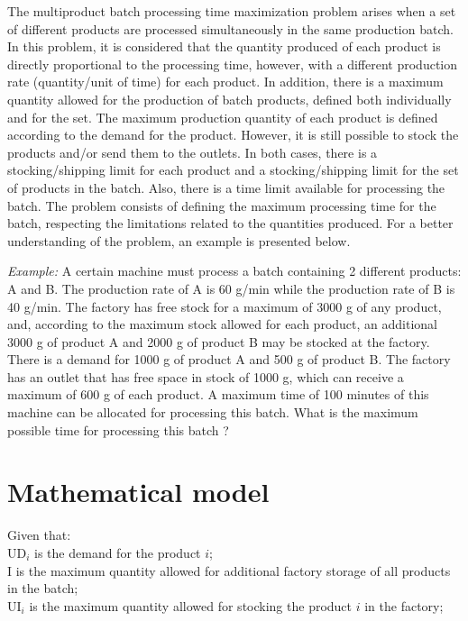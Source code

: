 \documentclass[preprint,12pt,authoryear]{elsarticle}
\begin{document}
The multiproduct batch processing time maximization problem arises when a set of different products are processed simultaneously in the same production batch. In this problem, it is considered that the quantity produced of each product is directly proportional to the processing time, however, with a different production rate (quantity/unit of time) for each product. In addition, there is a maximum quantity allowed for the production of batch products, defined both individually and for the set. The maximum production quantity of each product is defined according to the demand for the product. However, it is still possible to stock the products and/or send them to the outlets. In both cases, there is a stocking/shipping limit for each product and a stocking/shipping limit for the set of products in the batch. Also, there is a time limit available for processing the batch. The problem consists of defining the maximum processing time for the batch, respecting the limitations related to the quantities produced. For a better understanding of the problem, an example is presented below.

\emph{Example:} A certain machine must process a batch containing 2 different products: A and B. The production rate of A is 60 g/min while the production rate of B is 40 g/min. The factory has free stock for a maximum of 3000 g of any product, and, according to the maximum stock allowed for each product, an additional 3000 g of product A and 2000 g of product B may be stocked at the factory. There is a demand for 1000 g of product A and 500 g of product B. The factory has an outlet that has free space in stock of 1000 g, which can receive a maximum of 600 g of each product. A maximum time of 100 minutes of this machine can be allocated for processing this batch. What is the maximum possible time for processing this batch ? 

\section{Mathematical model}
\label{}

Given that: \\

$\textrm{UD}_i$ is the demand for the product $i$; \\

$\textrm{I}$ is the maximum quantity allowed for additional factory storage of all products in the batch; \\

$\textrm{UI}_i$ is the maximum quantity allowed for stocking the product $i$ in the factory; \\
\end{document}
